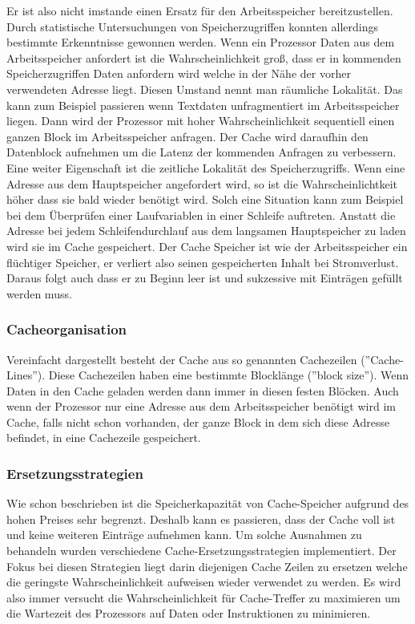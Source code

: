 \documentclass[12pt]{article}
\begin{document}
Er ist also nicht imstande einen Ersatz für den Arbeitsspeicher bereitzustellen. Durch statistische Untersuchungen von Speicherzugriffen konnten allerdings bestimmte Erkenntnisse gewonnen werden. Wenn ein Prozessor Daten aus dem Arbeitsspeicher anfordert ist die Wahrscheinlichkeit groß, dass er in kommenden Speicherzugriffen Daten anfordern wird welche in der Nähe der vorher verwendeten Adresse liegt. Diesen Umstand nennt man räumliche Lokalität. Das kann zum Beispiel passieren wenn Textdaten unfragmentiert im Arbeitsspeicher liegen. Dann wird der Prozessor mit hoher Wahrscheinlichkeit sequentiell einen ganzen Block im Arbeitsspeicher anfragen. Der Cache wird daraufhin den Datenblock aufnehmen um die Latenz der kommenden Anfragen zu verbessern. Eine weiter Eigenschaft ist die zeitliche Lokalität des Speicherzugriffs. Wenn eine Adresse aus dem Hauptspeicher angefordert wird, so ist die Wahrscheinlichtkeit höher dass sie bald wieder benötigt wird. Solch eine Situation kann zum Beispiel bei dem Überprüfen einer Laufvariablen in einer Schleife auftreten. Anstatt die Adresse bei jedem Schleifendurchlauf aus dem langsamen Hauptspeicher zu laden wird sie im Cache gespeichert. 
Der Cache Speicher ist wie der Arbeitsspeicher ein flüchtiger Speicher, er verliert also seinen gespeicherten Inhalt bei Stromverlust. Daraus folgt auch dass er zu Beginn leer ist und sukzessive mit Einträgen gefüllt werden muss.
\subsubsection{Cacheorganisation}
Vereinfacht dargestellt besteht der Cache aus so genannten Cachezeilen (''Cache-Lines''). Diese Cachezeilen haben eine bestimmte Blocklänge (''block size'')\cite{mikroprozessortechnik2011}. Wenn Daten in den Cache geladen werden dann immer in diesen festen Blöcken. Auch wenn der Prozessor nur eine Adresse aus dem Arbeitsspeicher benötigt wird im Cache, falls nicht schon vorhanden, der ganze Block in dem sich diese Adresse befindet, in eine Cachezeile gespeichert.
\subsubsection{Ersetzungsstrategien}
 Wie schon beschrieben ist die Speicherkapazität von Cache-Speicher aufgrund des hohen Preises sehr begrenzt. Deshalb kann es passieren, dass der Cache voll ist und keine weiteren Einträge aufnehmen kann. Um solche Ausnahmen zu behandeln wurden verschiedene Cache-Ersetzungsstrategien implementiert. Der Fokus bei diesen Strategien liegt darin diejenigen Cache Zeilen zu ersetzen welche die geringste Wahrscheinlichkeit aufweisen wieder verwendet zu werden. Es wird also immer versucht die Wahrscheinlichkeit für Cache-Treffer zu maximieren um die Wartezeit des Prozessors auf Daten oder Instruktionen zu minimieren. \cite{mikroprozessortechnik2011}
\end{document}
